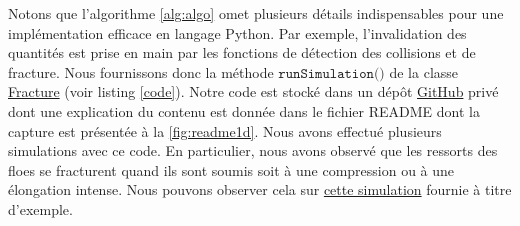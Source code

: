 
Notons que l'algorithme \ref{alg:algo} omet plusieurs détails indispensables pour une implémentation efficace en langage Python. Par exemple, l'invalidation des quantités est prise en main par les fonctions de détection des collisions et de fracture. Nous fournissons donc la méthode $\texttt{runSimulation()}$ de la classe \href{https://github.com/desmond-rn/ice-floes/blob/master/code/simu1D/FractureSolver.py}{Fracture} (voir listing \ref{code}). Notre code est stocké dans un dépôt \href{https://github.com/desmond-rn/ice-floes}{GitHub} privé dont une explication du contenu est donnée dans le fichier README dont la capture est présentée à la \cref{fig:readme1d}. Nous avons effectué plusieurs simulations avec ce code. En particulier, nous avons observé que les ressorts des floes se fracturent quand ils sont soumis soit à une compression ou à une élongation intense. Nous pouvons observer cela sur \href{https://seafile.unistra.fr/f/e08c4b4af6e244308867/}{cette simulation} fournie à titre d'exemple. 

